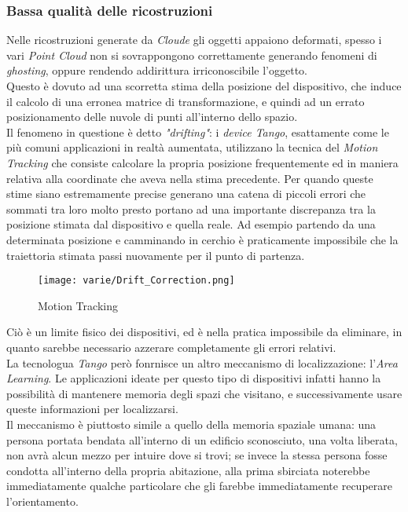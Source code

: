 \subsubsection{Bassa qualità delle ricostruzioni}
Nelle ricostruzioni generate da \emph{Cloude} gli oggetti appaiono deformati, spesso i vari \emph{Point Cloud} non si sovrappongono correttamente generando fenomeni di \emph{ghosting}, oppure rendendo addirittura irriconoscibile l'oggetto.\\
Questo è dovuto ad una scorretta stima della posizione del dispositivo, che induce il calcolo di una erronea matrice di transformazione, e quindi ad un errato posizionamento delle nuvole di punti all'interno dello spazio.\\
Il fenomeno in questione è detto \emph{"drifting"}: i \emph{device Tango}, esattamente come le più comuni applicazioni in realtà aumentata, utilizzano la tecnica del \emph{Motion Tracking} che consiste calcolare la propria posizione frequentemente ed in maniera relativa alla coordinate che aveva nella stima precedente. Per quando queste stime siano estremamente precise generano una catena di piccoli errori che sommati tra loro molto presto portano ad una importante discrepanza tra la posizione stimata dal dispositivo e quella reale. Ad esempio partendo da una determinata posizione e camminando in cerchio è praticamente impossibile che la traiettoria stimata passi nuovamente per il punto di partenza.
\begin{figure}[!h] 
    \centering 
    \texttt{[image: varie/Drift\_Correction.png]} 
    \caption{Motion Tracking}
\end{figure}
Ciò è un limite fisico dei dispositivi, ed è nella pratica impossibile da eliminare, in quanto sarebbe necessario azzerare completamente gli errori relativi.\\
La tecnologua \emph{Tango} però fonrnisce un altro meccanismo di localizzazione: l'\emph{Area Learning}. Le applicazioni ideate per questo tipo di dispositivi infatti hanno la possibilità di mantenere memoria degli spazi che visitano, e successivamente usare queste informazioni per localizzarsi.\\
Il meccanismo è piuttosto simile a quello della memoria spaziale umana: una persona portata bendata all'interno di un edificio sconosciuto, una volta liberata, non avrà alcun mezzo per intuire dove si trovi; se invece la stessa persona fosse condotta all'interno della propria abitazione, alla prima sbirciata noterebbe immediatamente qualche particolare che gli farebbe immediatamente recuperare l'orientamento.\\
